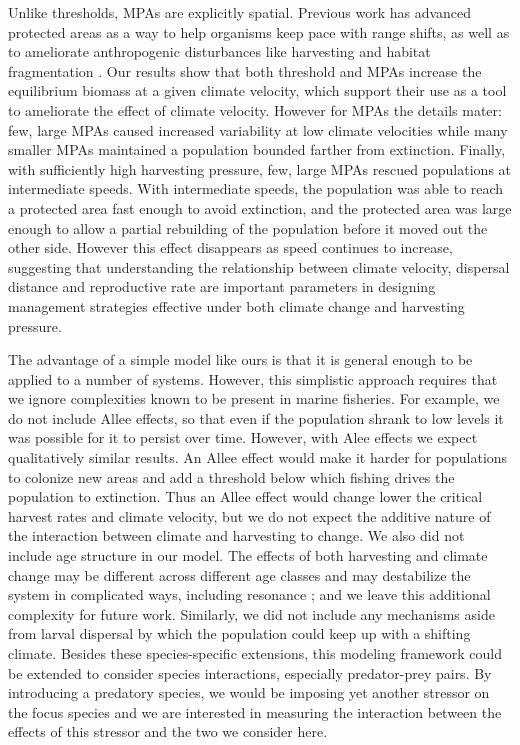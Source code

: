 \documentclass[12pt,english]{article}
\begin{document}
\begin{spacing}{1.9}
\begin{flushleft}
Unlike thresholds, MPAs are explicitly spatial.  Previous work has advanced protected areas as a way to help organisms keep pace with range shifts, as well as to ameliorate anthropogenic disturbances like harvesting and habitat fragmentation \citep{Lawleretal2010, Hannahetal2007,Botsfordetal2001, Gaylordetal2005, HastingsBotsford2003,Thomasetal2012}. Our results show that both threshold and MPAs increase the equilibrium biomass at a given climate velocity, which support their use as a tool to ameliorate the effect of climate velocity. However for MPAs the details mater: few, large MPAs caused increased variability at low climate velocities while many smaller MPAs maintained a population bounded farther from extinction. Finally, with sufficiently high harvesting pressure, few, large MPAs rescued populations at intermediate speeds. With intermediate speeds, the population was able to reach a protected area fast enough to avoid extinction, and the protected area was large enough to allow a partial rebuilding of the population before it moved out the other side. However this effect disappears as speed continues to increase, suggesting that understanding the relationship between climate velocity, dispersal distance and reproductive rate are important parameters in designing management strategies effective under both climate change and harvesting pressure. 

The advantage of a simple model like ours is that it is general enough to be applied to a number of systems.  However, this simplistic approach requires that we ignore complexities known to be present in marine fisheries. For example, we do not include Allee effects, so that even if the population shrank to low levels it was possible for it to persist over time. However, with Alee effects we expect qualitatively similar results. An Allee effect would make it harder for populations to colonize new areas and add a threshold below which fishing drives the population to extinction. Thus an Allee effect would change lower the critical harvest rates and climate velocity, but we do not expect the additive nature of the interaction between climate and harvesting to change.  We also did not include age structure in our model. The effects of both harvesting and climate change may be different across different age classes and may destabilize the system in complicated ways, including resonance \citep{Botsfordetal2011, Planqueetal2010}; and we leave this additional complexity for future work. Similarly, we did not include any mechanisms aside from larval dispersal by which the population could keep up with a shifting climate.  Besides these species-specific extensions, this modeling framework could be extended to consider species interactions, especially predator-prey pairs.  By introducing a predatory species, we would be imposing yet another stressor on the focus species \citep{Lingetal2009, Gurevitchetal2000} and we are interested in measuring the interaction between the effects of this stressor and the two we consider here.


\end{flushleft}
\end{spacing}
\end{document}
